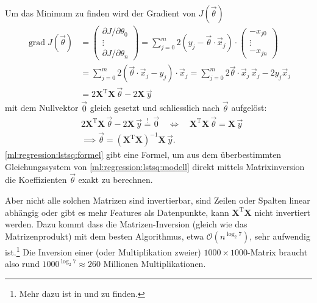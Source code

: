 Um das Minimum zu finden wird der Gradient von $J(\vec \theta)$ 
\begin{align}
    \operatorname{grad} J(\vec \theta) &=
    \begin{pmatrix} \partial J / \partial \theta_0 \\ \vdots \\ \partial J / \partial \theta_n \end{pmatrix}
    = \sum_{j = 0}^{m} 2 (y_j - \vec \theta \cdot \vec x_j) \cdot
    \begin{pmatrix} - x_{j0}\\ \vdots \\ - x_{jn} \end{pmatrix} \nonumber\\
    &= \sum_{j = 0}^{m} 2 \left( \vec \theta \cdot \vec x_j - y_j \right) \cdot \vec x_j
    = \sum_{j = 0}^{m} 2 \vec \theta \cdot \vec x_j\, \vec x_j - 2 y_j \vec x_j \nonumber\\
    &= 2 \mathbf{X}^\mathrm{T} \mathbf{X}\, \vec \theta - 2 \mathbf{X}\, \vec y
    \label{ml:regression:lstsq:grad}
\end{align}
mit dem Nullvektor $\vec 0$ gleich gesetzt
und schliesslich nach $\vec \theta$ aufgelöst:
\begin{align}
    &2\mathbf{X}^\mathrm{T} \mathbf{X}\, \vec \theta - 2 \mathbf{X}\, \vec y \overset{!}= \vec 0 \quad\Leftrightarrow\quad
    \mathbf{X}^\mathrm{T} \mathbf{X}\, \vec \theta = \mathbf{X}\, \vec y \nonumber\\
    &\implies \vec \theta = \left( \mathbf{X}^\mathrm{T} \mathbf{X} \right)^{-1} \mathbf{X} \, \vec y.
    \label{ml:regression:lstsq:formel}
\end{align}
\eqref{ml:regression:lstsq:formel} gibt eine Formel, um aus dem überbestimmten
Gleichungssystem von \eqref{ml:regression:lstsq:modell} direkt mittels Matrixinversion
die Koeffizienten $\vec \theta$ exakt zu berechnen.

\bigskip
Aber nicht alle solchen Matrizen sind invertierbar, sind Zeilen oder Spalten linear
abhängig oder gibt es mehr Features als Datenpunkte, kann $\mathbf{X}^\mathrm{T}\mathbf{X}$
nicht invertiert werden.
Dazu kommt dass die Matrizen-Inversion (gleich wie das Matrizenprodukt) mit dem besten
Algorithmus, etwa $\mathcal{O}(n^{\log_2 7})$, sehr aufwendig ist.\footnote{Mehr dazu ist
in \cite{ml:computational-complexity-math-op} und
\cite{ml:computational-complexity-matrix-mult} zu finden.} Die Inversion  einer (oder
Multiplikation zweier) $1000 \times 1000$-Matrix braucht also rund $1000^{\log_2 7}
\approx 260$ Millionen Multiplikationen.

